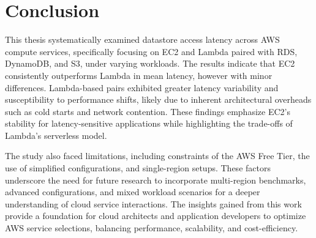 \section{Conclusion}
\label{cha:conclusion}

This thesis systematically examined datastore access latency across AWS compute services, specifically focusing on EC2 and Lambda paired with RDS, DynamoDB, and S3, under varying workloads. The results indicate that EC2 consistently outperforms Lambda in mean latency, however with minor differences. Lambda-based pairs exhibited greater latency variability and susceptibility to performance shifts, likely due to inherent architectural overheads such as cold starts and network contention. These findings emphasize EC2's stability for latency-sensitive applications while highlighting the trade-offs of Lambda's serverless model.

The study also faced limitations, including constraints of the AWS Free Tier, the use of simplified configurations, and single-region setups. These factors underscore the need for future research to incorporate multi-region benchmarks, advanced configurations, and mixed workload scenarios for a deeper understanding of cloud service interactions. The insights gained from this work provide a foundation for cloud architects and application developers to optimize AWS service selections, balancing performance, scalability, and cost-efficiency.

